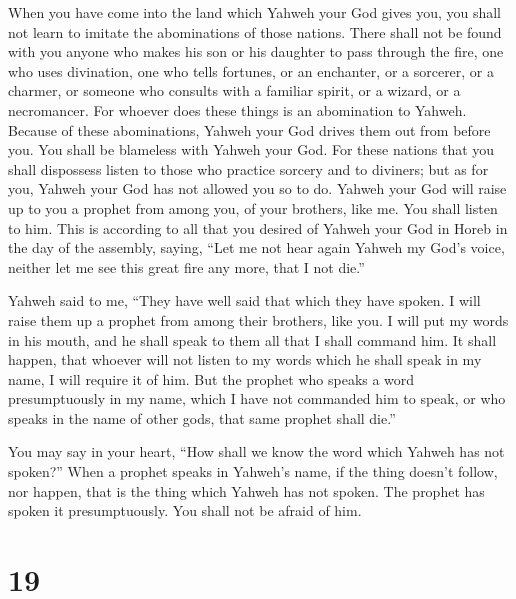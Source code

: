  When you have come into the land which Yahweh your God
gives you, you shall not learn to imitate the abominations of those
nations.  There shall not be found with you anyone who
makes his son or his daughter to pass through the fire, one who uses
divination, one who tells fortunes, or an enchanter, or a sorcerer,
 or a charmer, or someone who consults with a familiar
spirit, or a wizard, or a necromancer.  For whoever does
these things is an abomination to Yahweh. Because of these abominations,
Yahweh your God drives them out from before you.  You shall
be blameless with Yahweh your God.  For these nations that
you shall dispossess listen to those who practice sorcery and to
diviners; but as for you, Yahweh your God has not allowed you so to do.
 Yahweh your God will raise up to you a prophet from among
you, of your brothers, like me. You shall listen to him. 
This is according to all that you desired of Yahweh your God in Horeb in
the day of the assembly, saying, ``Let me not hear again Yahweh my God's
voice, neither let me see this great fire any more, that I not die.''

 Yahweh said to me, ``They have well said that which they
have spoken.  I will raise them up a prophet from among
their brothers, like you. I will put my words in his mouth, and he shall
speak to them all that I shall command him.  It shall
happen, that whoever will not listen to my words which he shall speak in
my name, I will require it of him.  But the prophet who
speaks a word presumptuously in my name, which I have not commanded him
to speak, or who speaks in the name of other gods, that same prophet
shall die.''

 You may say in your heart, ``How shall we know the word
which Yahweh has not spoken?''  When a prophet speaks in
Yahweh's name, if the thing doesn't follow, nor happen, that is the
thing which Yahweh has not spoken. The prophet has spoken it
presumptuously. You shall not be afraid of him.

\hypertarget{section-18}{%
\section{19}\label{section-18}}

